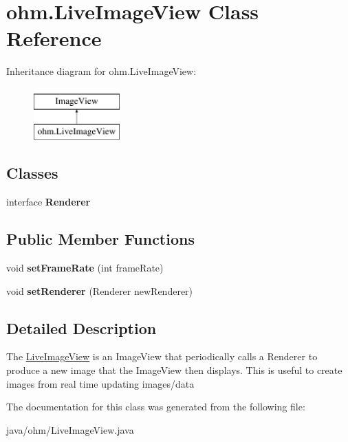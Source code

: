 \hypertarget{classohm_1_1_live_image_view}{}\section{ohm.\+Live\+Image\+View Class Reference}
\label{classohm_1_1_live_image_view}
Inheritance diagram for ohm.\+Live\+Image\+View\+:\begin{figure}[H]
\begin{center}
\leavevmode
\includegraphics[height=2.000000cm]{classohm_1_1_live_image_view}
\end{center}
\end{figure}
\subsection*{Classes}
\begin{DoxyCompactItemize}
\item 
interface {\bfseries Renderer}
\end{DoxyCompactItemize}
\subsection*{Public Member Functions}
\begin{DoxyCompactItemize}
\item 
\hypertarget{classohm_1_1_live_image_view_a944aea1e047d4d88821cbd060e616d28}{}\label{classohm_1_1_live_image_view_a944aea1e047d4d88821cbd060e616d28} 
void {\bfseries set\+Frame\+Rate} (int frame\+Rate)
\item 
\hypertarget{classohm_1_1_live_image_view_a7f184be7f1d4aa0ea2f76438a2750c50}{}\label{classohm_1_1_live_image_view_a7f184be7f1d4aa0ea2f76438a2750c50} 
void {\bfseries set\+Renderer} (Renderer new\+Renderer)
\end{DoxyCompactItemize}


\subsection{Detailed Description}
The \hyperlink{classohm_1_1_live_image_view}{Live\+Image\+View} is an Image\+View that periodically calls a Renderer to produce a new image that the Image\+View then displays. This is useful to create images from real time updating images/data 

The documentation for this class was generated from the following file\+:\begin{DoxyCompactItemize}
\item 
java/ohm/Live\+Image\+View.\+java\end{DoxyCompactItemize}

